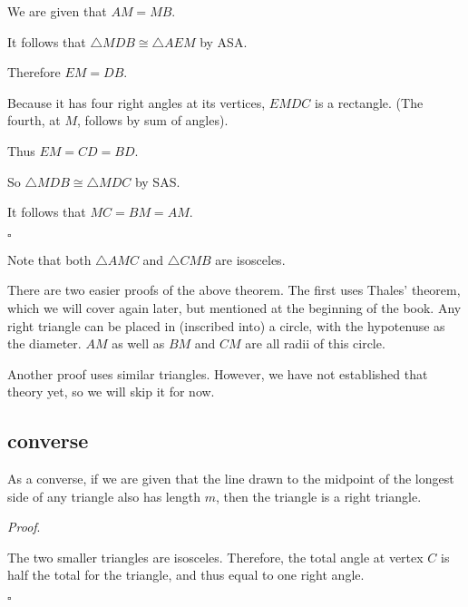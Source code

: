 \documentclass[11pt, oneside]{article}
\begin{document}
We are given that $AM = MB$.

It follows that $\triangle MDB \cong \triangle AEM$ by ASA.

Therefore $EM = DB$.

Because it has four right angles at its vertices, $EMDC$ is a rectangle.  (The fourth, at $M$, follows by sum of angles).

Thus $EM = CD = BD$.

So $\triangle MDB \cong \triangle MDC$ by SAS.

It follows that $MC = BM = AM$.

$\square$

Note that both $\triangle AMC$ and $\triangle CMB$ are isosceles.

There are two easier proofs of the above theorem.  The first uses Thales' theorem, which we will cover again later, but mentioned at the beginning of the book.  Any right triangle can be placed in (inscribed into) a circle, with the hypotenuse as the diameter.  $AM$ as well as $BM$ and $CM$ are all radii of this circle.

Another proof uses similar triangles.  However, we have not established that theory yet, so we will skip it for now.

\subsection*{converse}

As a converse, if we are given that the line drawn to the midpoint of the longest side of any triangle also has length $m$, then the triangle is a right triangle.

\emph{Proof}.

The two smaller triangles are isosceles.  Therefore, the total angle at vertex $C$ is half the total for the triangle, and thus equal to one right angle.

$\square$
\end{document}
